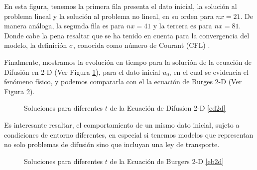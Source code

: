 \documentclass[A4,11pt]{article}
\begin{document}
 En esta figura, tenemos la primera fila presenta el dato inicial, la solución al problema lineal y la solución al problema no lineal, en su orden para $nx = 21$. De manera análoga, la segunda fila es para $nx = 41$ y la tercera es para $nx=81$. Donde cabe la pena resaltar que se ha tenido en cuenta para la convergencia del modelo, la definición $\sigma$, conocida como número de Courant (CFL) \cite{Achenson}.
 
 Finalmente, mostramos la evolución en tiempo para la solución de la ecuación de Difusión en 2-D (Ver Figura \ref{sol_ed}), para el dato inicial $u_0$, en el cual se evidencia el fenómeno físico, y podemos compararla con el la ecuación de Burges 2-D (Ver Figura \ref{sol_eb}). 
 
 \begin{figure}[h]
	\centering
	\caption{Soluciones para diferentes $t$ de la Ecuación de Difusion 2-D \ref{ed2d}}
	\label{sol_ed}
\end{figure}

Es interesante resaltar, el comportamiento de un mismo dato inicial, sujeto a condiciones de entorno diferentes, en especial si tenemos modelos que representan no solo problemas de difusión sino  que incluyan una ley de transporte.\\

\begin{figure}[h]
	\centering
	\caption{Soluciones para diferentes $t$ de la Ecuación de Burgers 2-D \ref{eb2d}}
	\label{sol_eb}
\end{figure}
\end{document}
